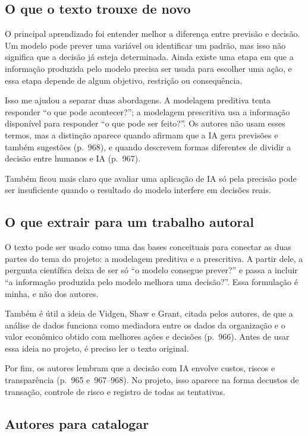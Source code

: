 \subsection*{O que o texto trouxe de novo}

O principal aprendizado foi entender melhor a diferença entre previsão e decisão. Um modelo pode prever uma variável ou identificar um padrão, mas isso não significa que a decisão já esteja determinada. Ainda existe uma etapa em que a informação produzida pelo modelo precisa ser usada para escolher uma ação, e essa etapa depende de algum objetivo, restrição ou consequência.

Isso me ajudou a separar duas abordagens. A modelagem preditiva tenta responder ``o que pode acontecer?''; a modelagem prescritiva usa a informação disponível para responder ``o que pode ser feito?''. Os autores não usam esses termos, mas a distinção aparece quando afirmam que a IA gera previsões e também sugestões (p.~968), e quando descrevem formas diferentes de dividir a decisão entre humanos e IA (p.~967).

Também ficou mais claro que avaliar uma aplicação de IA só pela precisão pode ser insuficiente quando o resultado do modelo interfere em decisões reais.

\subsection*{O que extrair para um trabalho autoral}

O texto pode ser usado como uma das bases conceituais para conectar as duas partes do tema do projeto: a modelagem preditiva e a prescritiva. A partir dele, a pergunta científica deixa de ser só ``o modelo consegue prever?'' e passa a incluir ``a informação produzida pelo modelo melhora uma decisão?''. Essa formulação é minha, e não dos autores.

Também é útil a ideia de Vidgen, Shaw e Grant, citada pelos autores, de que a análise de dados funciona como mediadora entre os dados da organização e o valor econômico obtido com melhores ações e decisões (p.~966). Antes de usar essa ideia no projeto, é preciso ler o texto original.

Por fim, os autores lembram que a decisão com IA envolve custos, riscos e transparência (p.~965 e~967--968). No projeto, isso aparece na forma decustos de transação, controle de risco e registro de todas as tentativas.

\subsection*{Autores para catalogar}

